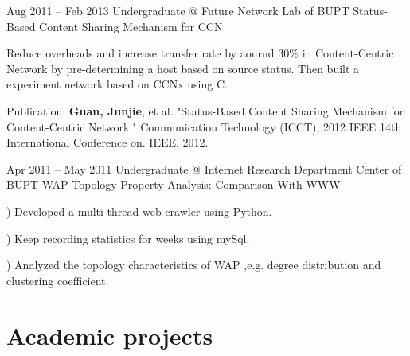 \documentclass{tccv}
\begin{document}
\begin{eventlist}

\item{Aug 2011 -- Feb 2013}
     {Undergraduate @ Future Network Lab of BUPT}
     {Status-Based Content Sharing Mechanism for CCN}
     
	Reduce overheads and increase transfer rate by aournd 30\% in Content-Centric Network by pre-determining a host based on source status. Then built a experiment network based on CCNx using C. 

Publication: \textbf{Guan, Junjie}, et al. "Status-Based Content Sharing Mechanism for Content-Centric Network." Communication Technology (ICCT), 2012 IEEE 14th International Conference on. IEEE, 2012. 

\item{Apr 2011 -- May 2011}
     {Undergraduate @ Internet Research Department Center of BUPT}
     {WAP Topology Property Analysis: Comparison With WWW}     
     
) Developed a multi-thread web crawler using Python. 

) Keep recording statistics for weeks using mySql. 

) Analyzed the topology characteristics of WAP ,e.g. degree distribution and clustering coefficient.\newline

\end{eventlist}














\section{Academic projects}
\end{document}
